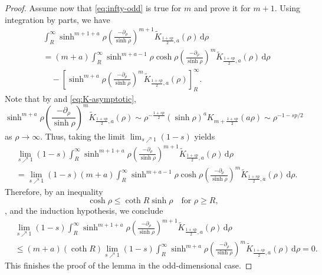 \documentclass[11pt]{amsart}
\theoremstyle{plain}
\theoremstyle{definition}
\numberwithin{equation}{section}
\begin{document}
\begin{proof}
Assume now that \eqref{eq:infty-odd} is true for $m$ and prove it for $m+1$. Using integration by parts, we have
\begin{align*}
&\int_{R}^{\infty} \sinh^{m+1+a}\rho \left( \frac{-\partial_{\rho}}{\sinh \rho} \right)^{m+1} \widetilde{K}_{\frac{1+sp}{2},a}(\rho) \, \mathrm{d}\rho \\
&= (m+a) \int_{R}^{\infty} \sinh^{m+a-1}\rho \cosh \rho \left( \frac{-\partial_{\rho}}{\sinh \rho} \right)^{m} \widetilde{K}_{\frac{1+sp}{2},a}(\rho) \, \mathrm{d}\rho \\
&\quad - \left[ \sinh^{m+a}\rho \left( \frac{-\partial_\rho}{\sinh \rho} \right)^m \widetilde{K}_{\frac{1+sp}{2},a}(\rho) \right]_R^{\infty}.
\end{align*}
Note that by  and \eqref{eq:K-asymptotic},
\begin{equation*}
\sinh^{m+a}\rho \left( \frac{-\partial_\rho}{\sinh \rho} \right)^m \widetilde{K}_{\frac{1+sp}{2},a}(\rho) \sim \rho^{-\frac{1+sp}{2}} (\sinh\rho)^{a} K_{m+\frac{1+sp}{2}}(a\rho) \sim \rho^{-1-sp/2}
\end{equation*}
as $\rho \to \infty$. Thus, taking the limit $\lim_{s \nearrow 1}(1-s)$ yields
\begin{equation*}
\begin{split}
&\lim_{s \nearrow 1} (1-s) \int_{R}^{\infty} \sinh^{m+1+a}\rho \left( \frac{-\partial_{\rho}}{\sinh \rho} \right)^{m+1} \widetilde{K}_{\frac{1+sp}{2},a}(\rho) \, \mathrm{d}\rho \\
&= \lim_{s \nearrow 1} (1-s) (m+a) \int_{R}^{\infty} \sinh^{m+a-1}\rho \cosh \rho \left( \frac{-\partial_{\rho}}{\sinh \rho} \right)^{m} \widetilde{K}_{\frac{1+sp}{2},a}(\rho) \, \mathrm{d}\rho.
\end{split}
\end{equation*}
Therefore, by an inequality
\begin{equation} \label{eq:coth}
\cosh \rho \leq \coth R \sinh \rho \quad\text{for } \rho \geq R,
\end{equation}
, and the induction hypothesis, we conclude
\begin{equation*}
\begin{split}
&\lim_{s \nearrow 1} (1-s) \int_{R}^{\infty} \sinh^{m+1+a}\rho \left( \frac{-\partial_{\rho}}{\sinh \rho} \right)^{m+1} \widetilde{K}_{\frac{1+sp}{2},a}(\rho) \, \mathrm{d}\rho \\
&\leq (m+a) (\coth R) \lim_{s \nearrow 1} (1-s) \int_{R}^{\infty} \sinh^{m+a}\rho \left( \frac{-\partial_{\rho}}{\sinh \rho} \right)^{m} \widetilde{K}_{\frac{1+sp}{2},a}(\rho) \, \mathrm{d}\rho = 0.
\end{split}
\end{equation*}
This finishes the proof of the lemma in the odd-dimensional case.


\end{proof}
\end{document}
